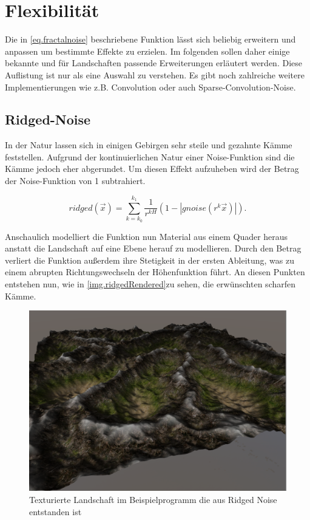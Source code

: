 \newpage
\section{Flexibilität}\label{NoiseVariationen}
Die in \ref{eq.fractalnoise} beschriebene Funktion lässt sich beliebig erweitern und anpassen um bestimmte Effekte zu erzielen. Im folgenden sollen daher einige bekannte und für Landschaften passende Erweiterungen erläutert werden. Diese Auflistung ist nur als eine Auswahl zu verstehen. Es gibt noch zahlreiche weitere Implementierungen wie z.B. Convolution oder auch Sparse-Convolution-Noise\cite{texturingAndModeling}.

\subsection{Ridged-Noise}
In der Natur lassen sich in einigen Gebirgen sehr steile und gezahnte Kämme feststellen. Aufgrund der kontinuierlichen Natur einer Noise-Funktion sind die Kämme jedoch eher abgerundet. 
Um diesen Effekt aufzuheben wird der Betrag der Noise-Funktion von 1 subtrahiert. 

\begin{equation} \label{eq.ridgedNoise}
ridged(\vec{x}) = \sum_{k=k_0}^{k_1}\frac{1}{r^{kH}}(1-\left|gnoise(r^k\vec{x})\right|).
\end{equation}

Anschaulich modelliert die Funktion nun Material aus einem Quader heraus anstatt die Landschaft auf eine Ebene herauf zu modellieren. Durch den Betrag verliert die Funktion außerdem ihre Stetigkeit in der ersten Ableitung, was zu einem abrupten Richtungswechseln der Höhenfunktion führt. An diesen Punkten entstehen nun, wie in \autoref{img.ridgedRendered}zu sehen, die erwünschten scharfen Kämme.

\newpage


\begin{figure}[!hbp]%
	\centering
	\includegraphics[width=\textwidth]{images/ridged_rendered.png}
	\caption{Texturierte Landschaft im Beispielprogramm die aus Ridged Noise entstanden ist}\label{img.ridgedRendered}
\end{figure}


